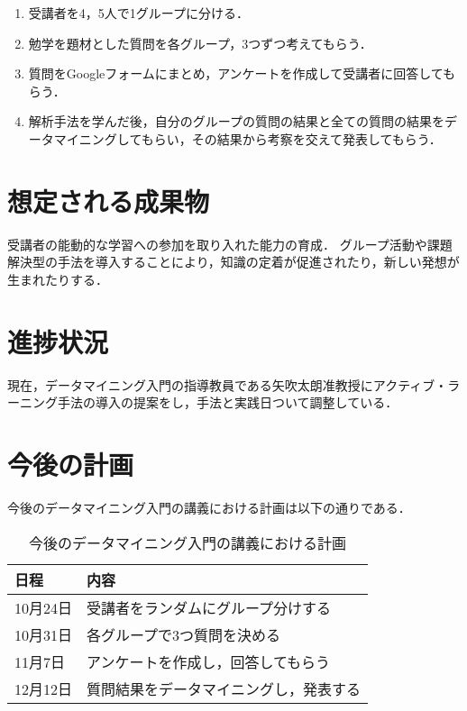 \documentclass[uplatex,twocolumn,dvipdfmx]{jsarticle}
\begin{document}
\begin{enumerate}

\item 受講者を4，5人で1グループに分ける．
\item 勉学を題材とした質問を各グループ，3つずつ考えてもらう．
\item 質問をGoogleフォームにまとめ，アンケートを作成して受講者に回答してもらう．
\item 解析手法を学んだ後，自分のグループの質問の結果と全ての質問の結果をデータマイニングしてもらい，その結果から考察を交えて発表してもらう．

\end{enumerate}


\section{想定される成果物}

受講者の能動的な学習への参加を取り入れた能力の育成．
グループ活動や課題解決型の手法を導入することにより，知識の定着が促進されたり，新しい発想が生まれたりする．


\section{進捗状況}

現在，データマイニング入門の指導教員である矢吹太朗准教授にアクティブ・ラーニング手法の導入の提案をし，手法と実践日ついて調整している．



\section{今後の計画}

今後のデータマイニング入門の講義における計画は以下の通りである．
\begin{table}[hbtp]
  \caption{今後のデータマイニング入門の講義における計画}
  \label{table:data_type}
  \centering
  \begin{tabular}{|l|l|}
    \hline
    日程 & 内容  \\ \hline \hline
    10月24日 & 受講者をランダムにグループ分けする \\
    10月31日 & 各グループで3つ質問を決める \\
    11月7日 & アンケートを作成し，回答してもらう \\
    12月12日 & 質問結果をデータマイニングし，発表する \\
 \hline
  \end{tabular}
\end{table}


\end{document}
